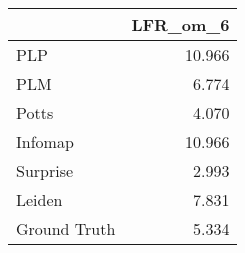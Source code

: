 \begin{tabular}{lr}
\toprule
{} & LFR_om_6 \\
\midrule
PLP          &   10.966 \\
PLM          &    6.774 \\
Potts        &    4.070 \\
Infomap      &   10.966 \\
Surprise     &    2.993 \\
Leiden       &    7.831 \\
Ground Truth &    5.334 \\
\bottomrule
\end{tabular}
